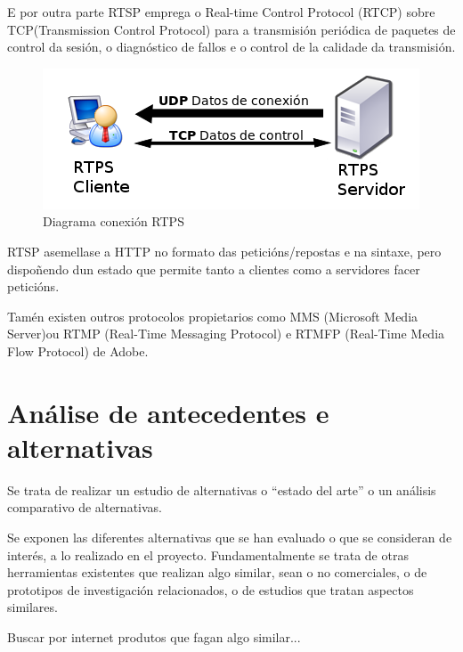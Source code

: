             E por outra parte RTSP emprega o Real-time Control Protocol (RTCP) sobre TCP(Transmission 
            Control Protocol) para a transmisión periódica de paquetes de control da sesión, o
            diagnóstico de fallos e o control de la calidade da transmisión.
            
            \begin{figure}[htp]
            \begin{center}
                \includegraphics[scale=0.6]{figures/RTPS-diagram.png}
                \caption{Diagrama conexión RTPS}
            \label{fig:RTPS-diagram}
            \end{center}
            \end{figure}
            
            RTSP asemellase a HTTP no formato das peticións/repostas e na sintaxe, pero dispoñendo 
            dun estado que permite tanto a clientes como a servidores facer peticións.

            Tamén existen outros protocolos propietarios como MMS (Microsoft Media Server)ou RTMP 
            (Real-Time Messaging Protocol) e RTMFP (Real-Time Media Flow Protocol) de Adobe.
  
\chapter{Análise de antecedentes e alternativas}
	Se trata de realizar un estudio de alternativas o “estado del arte” o un análisis comparativo
	de alternativas.

	Se exponen las diferentes alternativas que se han evaluado o que se consideran de interés, a
	lo realizado en el proyecto. Fundamentalmente se trata de otras herramientas existentes 
	que realizan algo similar, sean o no comerciales, o de prototipos de investigación relacionados,
	o de estudios que tratan aspectos similares.

	Buscar por internet produtos que fagan algo similar...